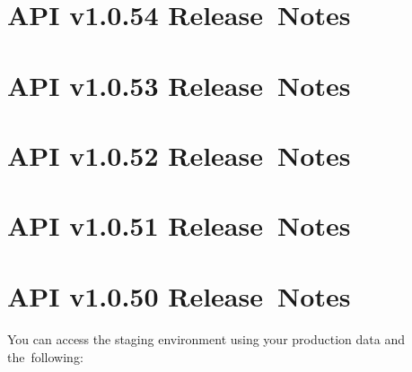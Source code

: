 \documentclass{memoir}%
\begin{document}
\paragraph*{}%

%
\section*{API v1.0.54 Release~Notes}%
\paragraph*{}%

%
\section*{API v1.0.53 Release~Notes}%
\paragraph*{}%

%
\section*{API v1.0.52 Release~Notes}%
\paragraph*{}%

%
\section*{API v1.0.51 Release~Notes}%
\paragraph*{}%

%
\section*{API v1.0.50 Release~Notes}%
\paragraph*{}%

%
\paragraph*{}%
You can access the staging environment using your production data and the~following:

%
\end{document}
